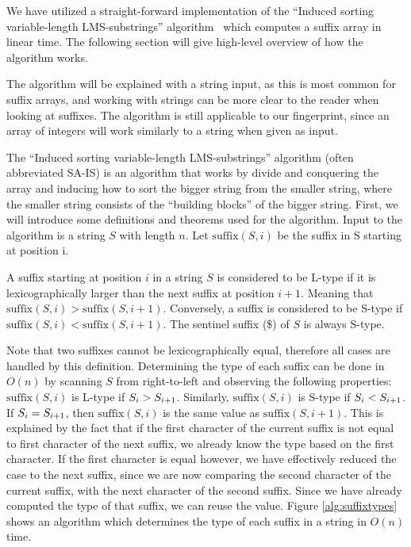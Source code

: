 We have utilized a straight-forward implementation of the ``Induced sorting
variable-length LMS-substrings'' algorithm~\cite{LinearTimeSuffixArraySAIS} which computes
a suffix array in linear time. The following section will give high-level overview of how
the algorithm works. 

The algorithm will be explained with a string input, as this is most common for suffix
arrays, and working with strings can be more clear to the reader when looking at suffixes.
The algorithm is still applicable to our fingerprint, since an array of integers will work
similarly to a string when given as input.

The ``Induced sorting variable-length LMS-substrings'' algorithm (often abbreviated SA-IS)
is an algorithm that works by divide and conquering the array and inducing how to sort the
bigger string from the smaller string, where the smaller string consists of the ``building
blocks'' of the bigger string. First, we will introduce some definitions and theorems used
for the algorithm. Input to the algorithm is a string $S$ with length $n$. Let
$\mathrm{suffix}(S, i)$ be the suffix in S starting at position i.

\begin{definition} A suffix starting at position $i$ in a
    string $S$ is considered to be L-type if it is lexicographically larger than the next
    suffix at position $i + 1$. Meaning that $\mathrm{suffix}(S, i) > \mathrm{suffix}(S,
    i+1)$. Conversely, a suffix is considered to be S-type if $\mathrm{suffix}(S, i) <
    \mathrm{suffix}(S, i+1)$. The sentinel suffix (\$) of $S$ is always S-type.
\end{definition}

Note that two suffixes cannot be lexicographically equal, therefore all cases are handled
by this definition. Determining the type of each suffix can be done in $O(n)$ by scanning
$S$ from right-to-left and observing the following properties: $\mathrm{suffix}(S, i)$ is
L-type if ${{S}_{i}} > {{S}_{i + 1}}$. Similarly, $\mathrm{suffix}(S, i)$ is
S-type if ${{S}_{i}} < {{S}_{i + 1}}$. If ${{S}_{i}} = {{S}_{i + 1}}$,
then $\mathrm{suffix}(S, i)$ is the same value as $\mathrm{suffix}(S, i + 1)$. This is
explained by the fact that if the first character of the current suffix is not equal to
first character of the next suffix, we already know the type based on the first character.
If the first character is equal however, we have effectively reduced the case to the next
suffix, since we are now comparing the second character of the current suffix, with the
next character of the second suffix. Since we have already computed the type of that
suffix, we can reuse the value. Figure \ref{alg:suffixtypes} shows an algorithm which
determines the type of each suffix in a string in $O(n)$ time.


